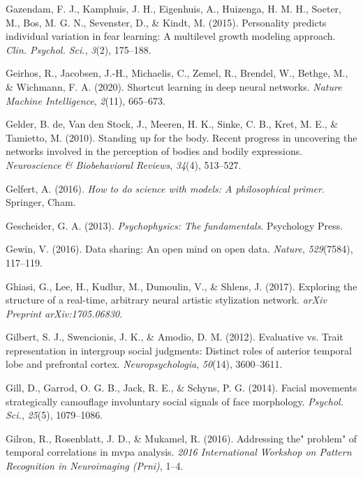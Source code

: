 \documentclass[11pt,american,a4paper,oneside,]{memoir} %
\begin{document}
\leavevmode\hypertarget{ref-Gazendam2015-fr}{}%
Gazendam, F. J., Kamphuis, J. H., Eigenhuis, A., Huizenga, H. M. H., Soeter, M., Bos, M. G. N., Sevenster, D., \& Kindt, M. (2015). Personality predicts individual variation in fear learning: A multilevel growth modeling approach. \emph{Clin. Psychol. Sci.}, \emph{3}(2), 175--188.

\leavevmode\hypertarget{ref-Geirhos2020-af}{}%
Geirhos, R., Jacobsen, J.-H., Michaelis, C., Zemel, R., Brendel, W., Bethge, M., \& Wichmann, F. A. (2020). Shortcut learning in deep neural networks. \emph{Nature Machine Intelligence}, \emph{2}(11), 665--673.

\leavevmode\hypertarget{ref-de2010standing}{}%
Gelder, B. de, Van den Stock, J., Meeren, H. K., Sinke, C. B., Kret, M. E., \& Tamietto, M. (2010). Standing up for the body. Recent progress in uncovering the networks involved in the perception of bodies and bodily expressions. \emph{Neuroscience \& Biobehavioral Reviews}, \emph{34}(4), 513--527.

\leavevmode\hypertarget{ref-Gelfert2016-hd}{}%
Gelfert, A. (2016). \emph{How to do science with models: A philosophical primer}. Springer, Cham.

\leavevmode\hypertarget{ref-Gescheider2013-zm}{}%
Gescheider, G. A. (2013). \emph{Psychophysics: The fundamentals}. Psychology Press.

\leavevmode\hypertarget{ref-Gewin2016-ff}{}%
Gewin, V. (2016). Data sharing: An open mind on open data. \emph{Nature}, \emph{529}(7584), 117--119.

\leavevmode\hypertarget{ref-ghiasi2017exploring}{}%
Ghiasi, G., Lee, H., Kudlur, M., Dumoulin, V., \& Shlens, J. (2017). Exploring the structure of a real-time, arbitrary neural artistic stylization network. \emph{arXiv Preprint arXiv:1705.06830}.

\leavevmode\hypertarget{ref-gilbert2012evaluative}{}%
Gilbert, S. J., Swencionis, J. K., \& Amodio, D. M. (2012). Evaluative vs. Trait representation in intergroup social judgments: Distinct roles of anterior temporal lobe and prefrontal cortex. \emph{Neuropsychologia}, \emph{50}(14), 3600--3611.

\leavevmode\hypertarget{ref-Gill2014-hx}{}%
Gill, D., Garrod, O. G. B., Jack, R. E., \& Schyns, P. G. (2014). Facial movements strategically camouflage involuntary social signals of face morphology. \emph{Psychol. Sci.}, \emph{25}(5), 1079--1086.

\leavevmode\hypertarget{ref-gilron2016addressing}{}%
Gilron, R., Rosenblatt, J. D., \& Mukamel, R. (2016). Addressing the" problem" of temporal correlations in mvpa analysis. \emph{2016 International Workshop on Pattern Recognition in Neuroimaging (Prni)}, 1--4.
\end{document}
